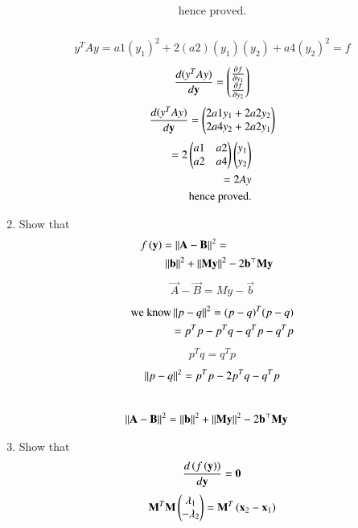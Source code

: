 \documentclass[journal,12pt,twocolumn]{IEEEtran}
\renewcommand\thesection{\arabic{section}}
\begin{document}
\begin{enumerate}[label=\thesection.\arabic*.,ref=\thesection.\theenumi]
\begin{align*}
\text{hence proved.}
\end{align*}
\\
\begin{align*}
y^TAy = a1(y_1)^2 + 2(a2)(y_1)(y_2) + a4(y_2)^2 = f
\end{align*}
\begin{align*}
\frac{d(y^TAy)}{d\mathbf{y}} = \begin{pmatrix}\frac{\partial f}{\partial y_1} \\ \frac{\partial f}{\partial y_2}\end{pmatrix}
\end{align*}
\begin{align*}
\frac{d(y^TAy)}{d\mathbf{y}} = \begin{pmatrix}2a1y_1 + 2a2y_2 \\ 2a4y_2 + 2a2y_1\end{pmatrix}
\end{align*}
\begin{align*}
=2\begin{pmatrix}a1 & a2 \\ a2 & a4\end{pmatrix} \begin{pmatrix}y_1 \\ y_2\end{pmatrix}
\\
=2Ay \\
\text{hence proved.}
\end{align*}

\item Show that 
\begin{align}
	f\left(
\mathbf{y}
	\right)
	=
	\left\lVert
\mathbf{A}-\mathbf{B}\right\rVert^2
	= 
	\\
\left\lVert\mathbf{b}\right\rVert^2 
	+ 
	\left\lVert  \mathbf{M}
	 \mathbf{y}\right\rVert^2	
	 &- 2\mathbf{b}^{\top}
	  \mathbf{M}
	  \mathbf{y}
\label{eq:pseudo_AB-dist}
\end{align}
\solution
\begin{align*}
\vec{A} - \vec{B} = My - \vec{b}
\end{align*}
\begin{align*}
\text{we know}
\left\lVert p-q\right\rVert^2 = (p-q)^T(p-q) \\
			= p^Tp - p^Tq - q^Tp - q^Tp \\
\end{align*} 
\begin{align*}
p^Tq=q^Tp
\end{align*} 
\begin{align*}
\left\lVert p-q\right\rVert^2 = p^Tp - 2p^Tq - q^Tp
\end{align*}
\\
\begin{align*}
\left\lVert\mathbf{A} - \mathbf{B}\right\rVert^2 = 
\left\lVert\mathbf{b}\right\rVert^2 
	+ 
	\left\lVert  \mathbf{M}
	 \mathbf{y}\right\rVert^2	
	 &- 2\mathbf{b}^{\top}
	  \mathbf{M}
	  \mathbf{y}
\end{align*}
\item Show that 
\begin{align}
	\frac{d\left(f\left(\mathbf{y}\right)\right)}{d\mathbf{y}} = \mathbf{0}
\end{align}
\begin{align}
    \mathbf{M}^T\mathbf{M}\begin{pmatrix}\lambda_1\\-\lambda_2\end{pmatrix} = \mathbf{M}^T\left(\mathbf{x}_2-\mathbf{x}_1\right)
\end{align}
\newpage
\solution


\end{enumerate}
\end{document}
